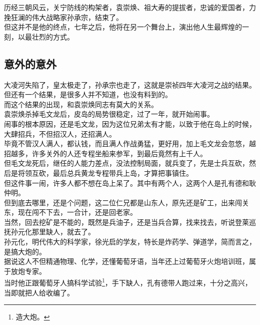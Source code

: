 \begin{multicols}{\theparacolNo}
历经三朝风云，关宁防线的构架者，袁崇焕、祖大寿的提拔者，忠诚的爱国者，力挽狂澜的伟大战略家孙承宗，结束了。\\

但这并不是他的终点，七年之后，他将在另一个舞台上，演出他人生最辉煌的一刻，以最壮烈的方式。\\

\subsection{意外的意外}
大凌河失陷了，皇太极走了，孙承宗也走了，这就是崇祯四年大凌河之战的结果。\\

但还有一个结果，是很多人并不知道，也没有料到的。\\

而这个结果的出现，和袁崇焕同志有莫大的关系。\\

袁崇焕杀掉毛文龙后，皮岛的局势很稳定，过了一年，就开始闹事。\\

闹事的根本原因，还是毛文龙，因为这位兄弟太有才能，以致于他在岛上的时候，大肆招兵，不但招汉人，还招满人。\\

毕竟不管汉人满人，都认钱，而且满人作战勇猛，更好用，加上毛文龙会忽悠，越招越多，许多关外的人还专程坐船来参军，到最后竟然有上千人。\\

但毛文龙死后，继任的人能力差点，没法控制局面，就兵变了，先是士兵互砍，然后是将领互砍，最后总兵黄龙专程带兵上岛，才算把事镇住。\\

但这件事一闹，许多人都不想在岛上呆了。其中有两个人，这两个人是孔有德和耿仲明。\\

但到底去哪里，还是个问题，这二位仁兄都是山东人，原先还是矿工，出来闯关东，现在闯不下去，一合计，还是回老家。\\

当然，回去挖矿是不能的，既然是兵油子，还是当兵合算，找来找去，听说登莱巡抚孙元化那里缺人，就去了。\\

孙元化，明代伟大的科学家，徐光启的学友，特长是炸药学、弹道学，简而言之，是搞大炮的。\\

据说这人不但精通物理、化学，还懂葡萄牙语，当年还上过葡萄牙火炮培训班，属于放炮专家。\\

当时他正跟葡萄牙人搞科学试验\footnote{造大炮。}，手下缺人，孔有德带人跑过来，十分之高兴，当即就把人给收编了。\\


\end{multicols}

